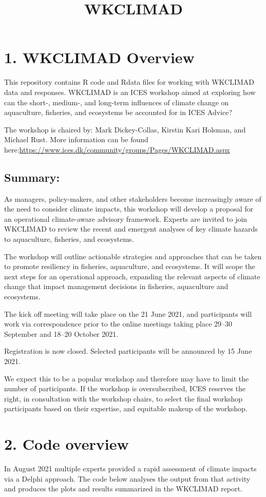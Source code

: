 \documentclass[
]{article}
\title{WKCLIMAD}
\author{}
\date{\vspace{-2.5em}}
\begin{document}
\maketitle

{
\setcounter{tocdepth}{2}
\tableofcontents
}
\hypertarget{wkclimad-overview}{%
\section{1. WKCLIMAD Overview}\label{wkclimad-overview}}

This repository contains R code and Rdata files for working with
WKCLIMAD data and responses. WKCLIMAD is an ICES workshop aimed at
exploring how can the short-, medium-, and long-term influences of
climate change on aquaculture, fisheries, and ecosystems be accounted
for in ICES Advice?

The workshop is chaired by: Mark Dickey-Collas, Kirstin Kari Holsman,
and Michael Rust. More information can be found
here:\url{https://www.ices.dk/community/groups/Pages/WKCLIMAD.aspx}

\hypertarget{summary}{%
\subsection{Summary:}\label{summary}}

As managers, policy-makers, and other stakeholders become increasingly
aware of the need to consider climate impacts, this workshop will
develop a proposal for an operational climate-aware advisory framework.
Experts are invited to join WKCLIMAD to review the recent and emergent
analyses of key climate hazards to aquaculture, fisheries, and
ecosystems.

The workshop will outline actionable strategies and approaches that can
be taken to promote resiliency in fisheries, aquaculture, and
ecosystems. It will scope the next steps for an operational approach,
expanding the relevant aspects of climate change that impact management
decisions in fisheries, aquaculture and ecosystems.

The kick off meeting will take place on the 21 June 2021, and
participants will work via correspondence prior to the online meetings
taking place 29--30 September and 18--20 October 2021.

Registration is now closed. Selected participants will be announced by
15 June 2021.

We expect this to be a popular workshop and therefore may have to limit
the number of participants. If the workshop is oversubscribed, ICES
reserves the right, in consultation with the workshop chairs, to select
the final workshop participants based on their expertise, and equitable
makeup of the workshop.

\hypertarget{code-overview}{%
\section{2. Code overview}\label{code-overview}}

In August 2021 multiple experts provided a rapid assessment of climate
impacts via a Delphi approach. The code below analyses the output from
that activity and produces the plots and results summarized in the
WKCLIMAD report.
\end{document}
